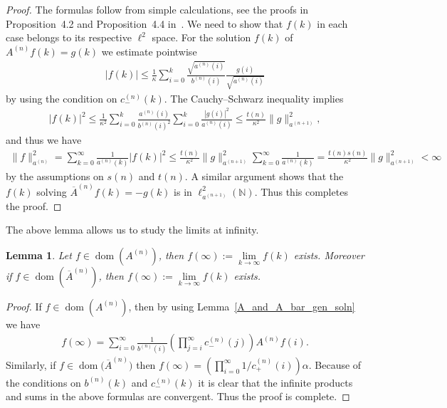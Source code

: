 \documentclass[pdftex]{sigma}
\numberwithin{equation}{section}
\newtheorem{lem}[theo]{Lemma}
\DeclareMathOperator{\dom}{dom}
\begin{document}
\begin{proof}
The formulas follow from simple calculations, see the proofs in Proposition~4.2 and Proposition~4.4 in~\cite{KM1}.
We need to show that $f(k)$ in each case belongs to its respective $\ell^2$ space.
For the solution $f(k)$ of $A^{(n)}f(k) = g(k)$ we estimate pointwise
\begin{gather*}
|f(k)| \le \frac{1}{\kappa}\sum\limits_{i=0}^k\frac{\sqrt{a^{(n)}(i)}}{b^{(n)}(i)}\frac{g(i)}{\sqrt{a^{(n)}(i)}}
\end{gather*}
by using the condition on $c_-^{(n)}(k)$.
The Cauchy--Schwarz inequality implies
\begin{gather*}
|f(k)|^2 \le \frac{1}{\kappa^2}\sum\limits_{i=0}^k \frac{a^{(n)}(i)}{b^{(n)}(i)^2}\sum\limits_{i=0}^k
\frac{|g(i)|^2}{a^{(n)}(i)}\le \frac{t(n)}{\kappa^2}\|g\|_{a^{(n+1)}}^2,
\end{gather*}
and thus we have
\begin{gather*}
\|f\|_{a^{(n)}}^2 = \sum\limits_{k=0}^\infty \frac{1}{a^{(n)}(k)}|f(k)|^2 \le
\frac{t(n)}{\kappa^2}\|g\|_{a^{(n+1)}}^2\sum\limits_{k=0}^\infty \frac{1}{a^{(n)}(k)}=
\frac{t(n)s(n)}{\kappa^2}\|g\|_{a^{(n+1)}}^2 < \infty
\end{gather*}
by the assumptions on $s(n)$ and $t(n)$.
A similar argument shows that the $f(k)$ solving $\overline{A}^{(n)}f(k) = -g(k)$ is in $\ell_{a^{(n+1)}}^2({\mathbb
N})$.
Thus this completes the proof.
\end{proof}

The above lemma allows us to study the limits at inf\/inity.

\begin{lem}%
Let $f\in \dom(A^{(n)})$, then $f(\infty):= \lim\limits_{k\to\infty} f(k)$ exists.
Moreover if $f\in \dom(\overline{A}^{(n)})$, then $f(\infty):= \lim\limits_{k\to\infty} f(k)$ exists.
\end{lem}

\begin{proof}
If $f\in \dom(A^{(n)})$, then by using Lemma~\ref{A_and_A_bar_gen_soln} we have
\begin{gather*}
f(\infty) = \sum\limits_{i=0}^\infty
\frac{1}{b^{(n)}(i)}\left(\prod\limits_{j=i}^{\infty}c_-^{(n)}(j)\right)A^{(n)}f(i).
\end{gather*}
Similarly, if $f\in\dom\big(\overline{A}^{(n)}\big)$ then $f(\infty) = \left(\prod\limits_{i=0}^\infty 1/c_+^{(n)}(i)
\right)\alpha$.
Because of the conditions on $b^{(n)}(k)$ and $c_-^{(n)}(k)$ it is clear that the inf\/inite products and sums in the
above formulas are convergent.
Thus the proof is complete.
\end{proof}
\end{document}
